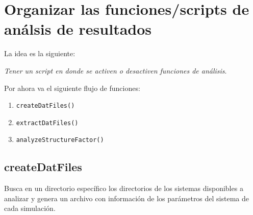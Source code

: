 \documentclass[../main.tex]{subfiles}
\begin{document}
\section{Organizar las funciones/scripts de análsis de resultados}

La idea es la siguiente:

\begin{minipage}{0.8\textwidth}
    \large
    \emph{Tener un script en donde se activen o desactiven funciones de análisis}.
\end{minipage}

Por ahora va el siguiente flujo de funciones:
\begin{enumerate}
    \item \verb|createDatFiles()|
    \item \verb|extractDatFiles()|
    \item \verb|analyzeStructureFactor()|
\end{enumerate}

\subsection{createDatFiles}

Busca en un directorio específico los directorios de los sistemas disponibles a analizar y genera un archivo con información de los parámetros del sistema de cada simulación.
\end{document}
